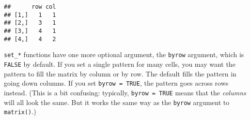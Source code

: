 \documentclass[]{article}
\newenvironment{Shaded}{\begin{snugshade}}{\end{snugshade}}
\newcommand{\CommentTok}[1]{\textcolor[rgb]{0.56,0.35,0.01}{\textit{#1}}}
\newcommand{\DataTypeTok}[1]{\textcolor[rgb]{0.13,0.29,0.53}{#1}}
\newcommand{\DecValTok}[1]{\textcolor[rgb]{0.00,0.00,0.81}{#1}}
\newcommand{\KeywordTok}[1]{\textcolor[rgb]{0.13,0.29,0.53}{\textbf{#1}}}
\newcommand{\NormalTok}[1]{#1}
\newcommand{\OperatorTok}[1]{\textcolor[rgb]{0.81,0.36,0.00}{\textbf{#1}}}
\newcommand{\OtherTok}[1]{\textcolor[rgb]{0.56,0.35,0.01}{#1}}
\newcommand{\StringTok}[1]{\textcolor[rgb]{0.31,0.60,0.02}{#1}}
\begin{document}
\begin{verbatim}
##      row col
## [1,]   1   1
## [2,]   3   1
## [3,]   4   1
## [4,]   4   2
\end{verbatim}

\FloatBarrier

\texttt{set\_*} functions have one more optional argument, the
\texttt{byrow} argument, which is \texttt{FALSE} by default. If you set
a single pattern for many cells, you may want the pattern to fill the
matrix by column or by row. The default fills the pattern in going down
columns. If you set \texttt{byrow\ =\ TRUE}, the pattern goes across
rows instead. (This is a bit confusing: typically,
\texttt{byrow\ =\ TRUE} means that the \emph{columns} will all look the
same. But it works the same way as the \texttt{byrow} argument to
\texttt{matrix()}.)

\begin{Shaded}
\end{Shaded}
\end{document}
